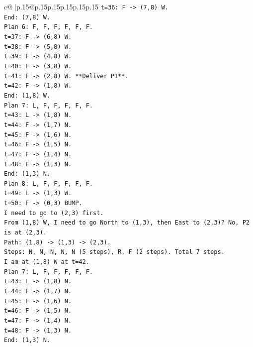 \documentclass{article}
\begin{document}
{\begin{supertabular}{c@{$\;$}|p{.15\linewidth}@{}p{.15\linewidth}p{.15\linewidth}p{.15\linewidth}p{.15\linewidth}p{.15\linewidth}}
{{{\texttt{t=36: F {-}> (7,8) W.} \\
\texttt{End: (7,8) W.} \\
\texttt{Plan 6: F, F, F, F, F, F.} \\
\texttt{t=37: F {-}> (6,8) W.} \\
\texttt{t=38: F {-}> (5,8) W.} \\
\texttt{t=39: F {-}> (4,8) W.} \\
\texttt{t=40: F {-}> (3,8) W.} \\
\texttt{t=41: F {-}> (2,8) W. **Deliver P1**.} \\
\texttt{t=42: F {-}> (1,8) W.} \\
\texttt{End: (1,8) W.} \\
\texttt{Plan 7: L, F, F, F, F, F.} \\
\texttt{t=43: L {-}> (1,8) N.} \\
\texttt{t=44: F {-}> (1,7) N.} \\
\texttt{t=45: F {-}> (1,6) N.} \\
\texttt{t=46: F {-}> (1,5) N.} \\
\texttt{t=47: F {-}> (1,4) N.} \\
\texttt{t=48: F {-}> (1,3) N.} \\
\texttt{End: (1,3) N.} \\
\texttt{Plan 8: L, F, F, F, F, F.} \\
\texttt{t=49: L {-}> (1,3) W.} \\
\texttt{t=50: F {-}> (0,3) BUMP.} \\
\texttt{I need to go to (2,3) first.} \\
\texttt{From (1,8) W, I need to go North to (1,3), then East to (2,3)? No, P2 is at (2,3).} \\
\texttt{Path: (1,8) {-}> (1,3) {-}> (2,3).} \\
\texttt{Steps: N, N, N, N, N (5 steps), R, F (2 steps). Total 7 steps.} \\
\texttt{I am at (1,8) W at t=42.} \\
\texttt{Plan 7: L, F, F, F, F, F.} \\
\texttt{t=43: L {-}> (1,8) N.} \\
\texttt{t=44: F {-}> (1,7) N.} \\
\texttt{t=45: F {-}> (1,6) N.} \\
\texttt{t=46: F {-}> (1,5) N.} \\
\texttt{t=47: F {-}> (1,4) N.} \\
\texttt{t=48: F {-}> (1,3) N.} \\
\texttt{End: (1,3) N.} \\
}}}
\end{supertabular}}
\end{document}
